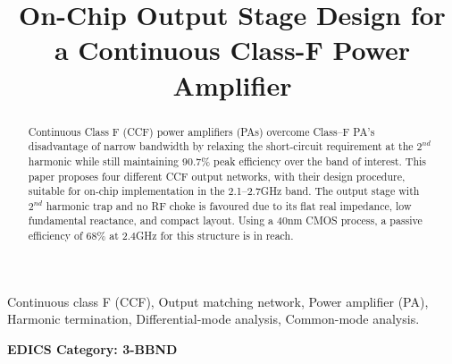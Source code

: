 \documentclass[conference]{IEEEtran}
\begin{document}
\title{On-Chip Output Stage Design for a  Continuous Class-F Power Amplifier}


\maketitle

\begin{abstract}
Continuous Class F (CCF) power amplifiers (PAs) overcome Class--F PA's disadvantage of narrow bandwidth by relaxing the short-circuit requirement at the $2^{nd}$ harmonic while still maintaining 90.7\% peak efficiency over the band of interest. This paper proposes four different CCF output networks, with their design procedure, suitable for on-chip implementation in the 2.1--2.7GHz band. The output stage with $2^{nd}$ harmonic trap and no RF choke is favoured due to its flat real impedance, low fundamental reactance, and compact layout. Using a 40nm CMOS process, a passive efficiency of 68\% at 2.4GHz for this structure is in reach.
\end{abstract}

\vspace{1mm}
\begin{IEEEkeywords}
Continuous class F (CCF), Output matching network, Power amplifier (PA), Harmonic termination, Differential-mode analysis, Common-mode analysis. 
\end{IEEEkeywords}


\ifCLASSOPTIONpeerreview
\begin{center} \bfseries EDICS Category: 3-BBND \end{center}
\fi

\IEEEpeerreviewmaketitle
\end{document}
